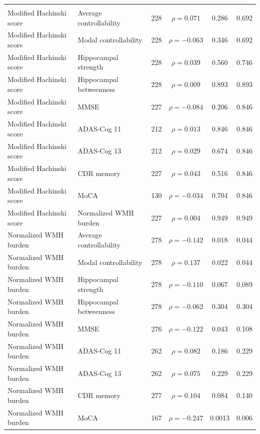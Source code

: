 \documentclass{article}
\begin{document}
\begin{table}[!htbp]
\begin{tabularx}{\textwidth}{@{}>{\raggedright\arraybackslash}X
                                  >{\raggedright\arraybackslash}p{3.5cm}
                                  cccc@{}}
\multicolumn{6}{l}{\textbf{C. Diagnosis- and demographic-adjusted partial Spearman associations}}\\
Modified Hachinski score & Average controllability
 & 228 & \(\rho=0.071\) & 0.286 & 0.692\\
Modified Hachinski score & Modal controllability
 & 228 & \(\rho=-0.063\) & 0.346 & 0.692\\
Modified Hachinski score & Hippocampal strength
 & 228 & \(\rho=0.039\) & 0.560 & 0.746\\
Modified Hachinski score & Hippocampal betweenness
 & 228 & \(\rho=0.009\) & 0.893 & 0.893\\
Modified Hachinski score & MMSE
 & 227 & \(\rho=-0.084\) & 0.206 & 0.846\\
Modified Hachinski score & ADAS-Cog 11
 & 212 & \(\rho=0.013\) & 0.846 & 0.846\\
Modified Hachinski score & ADAS-Cog 13
 & 212 & \(\rho=0.029\) & 0.674 & 0.846\\
Modified Hachinski score & CDR memory
 & 227 & \(\rho=0.043\) & 0.516 & 0.846\\
Modified Hachinski score & MoCA
 & 130 & \(\rho=-0.034\) & 0.704 & 0.846\\
Modified Hachinski score & Normalized WMH burden
 & 227 & \(\rho=0.004\) & 0.949 & 0.949\\
\addlinespace
Normalized WMH burden & Average controllability
 & 278 & \(\rho=-0.142\) & 0.018 & 0.044\\
Normalized WMH burden & Modal controllability
 & 278 & \(\rho=0.137\) & 0.022 & 0.044\\
Normalized WMH burden & Hippocampal strength
 & 278 & \(\rho=-0.110\) & 0.067 & 0.089\\
Normalized WMH burden & Hippocampal betweenness
 & 278 & \(\rho=-0.062\) & 0.304 & 0.304\\
Normalized WMH burden & MMSE
 & 276 & \(\rho=-0.122\) & 0.043 & 0.108\\
Normalized WMH burden & ADAS-Cog 11
 & 262 & \(\rho=0.082\) & 0.186 & 0.229\\
Normalized WMH burden & ADAS-Cog 13
 & 262 & \(\rho=0.075\) & 0.229 & 0.229\\
Normalized WMH burden & CDR memory
 & 277 & \(\rho=0.104\) & 0.084 & 0.140\\
Normalized WMH burden & MoCA
 & 167 & \(\rho=-0.247\) & 0.0013 & 0.006\\
\bottomrule
\end{tabularx}


\end{table}
\end{document}
